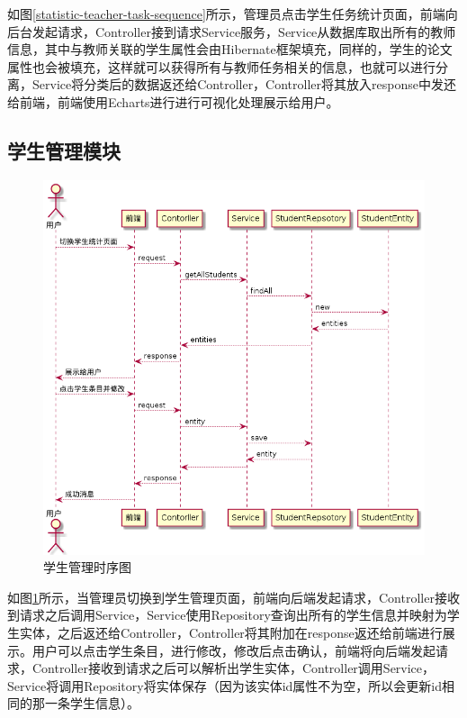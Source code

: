 如图\ref{statistic-teacher-task-sequence}所示，管理员点击学生任务统计页面，前端向后台发起请求，Controller接到请求Service服务，Service从数据库取出所有的教师信息，其中与教师关联的学生属性会由Hibernate框架填充，同样的，学生的论文属性也会被填充，这样就可以获得所有与教师任务相关的信息，也就可以进行分离，Service将分类后的数据返还给Controller，Controller将其放入response中发还给前端，前端使用Echarts进行进行可视化处理展示给用户。

\subsection{学生管理模块}

\begin{figure}
    \centering
    \includegraphics[scale = 0.6]{out/uml/时序图/manage-student-sequence/manage-student-sequence.png}
    \caption{\song\wuhao 学生管理时序图}
    \label{manage-student-sequence}
\end{figure}

如图\ref{manage-student-sequence}所示，当管理员切换到学生管理页面，前端向后端发起请求，Controller接收到请求之后调用Service，Service使用Repository查询出所有的学生信息并映射为学生实体，之后返还给Controller，Controller将其附加在response返还给前端进行展示。用户可以点击学生条目，进行修改，修改后点击确认，前端将向后端发起请求，Controller接收到请求之后可以解析出学生实体，Controller调用Service，Service将调用Repository将实体保存（因为该实体id属性不为空，所以会更新id相同的那一条学生信息）。


